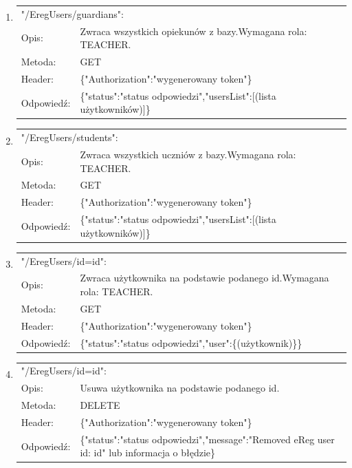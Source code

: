 \documentclass[12pt, titlepage]{article}
\begin{document}
\begin{enumerate}
	\item
	{\renewcommand{\arraystretch}{1.5}
	\begin{tabular}[t]{p{3cm} p{15cm}}
	\multicolumn{2}{l}{"/EregUsers/guardians":} \\
	Opis: &  Zwraca wszystkich opiekunów z bazy.\newline Wymagana rola: TEACHER. \\
	Metoda: & GET \\
	Header: & \{"Authorization":"wygenerowany token"\} \\
	Odpowiedź: & \{"status":"status odpowiedzi",\newline "usersList":[(lista użytkowników)]\}
	\end{tabular}}
	
	\item
	{\renewcommand{\arraystretch}{1.5}
	\begin{tabular}[t]{p{3cm} p{15cm}}
	\multicolumn{2}{l}{"/EregUsers/students":} \\
	Opis: &  Zwraca wszystkich uczniów z bazy.\newline Wymagana rola: TEACHER. \\
	Metoda: & GET \\
	Header: & \{"Authorization":"wygenerowany token"\} \\
	Odpowiedź: & \{"status":"status odpowiedzi",\newline "usersList":[(lista użytkowników)]\}
	\end{tabular}}
	
	\item
	{\renewcommand{\arraystretch}{1.5}
	\begin{tabular}[t]{p{3cm} p{15cm}}
	\multicolumn{2}{l}{"/EregUsers/id={id}":} \\
	Opis: &  Zwraca użytkownika na podstawie podanego id.\newline Wymagana rola: TEACHER. \\
	Metoda: & GET \\
	Header: & \{"Authorization":"wygenerowany token"\} \\
	Odpowiedź: & \{"status":"status odpowiedzi",\newline "user":\{(użytkownik)\}\}
	\end{tabular}}
	
	\item
	{\renewcommand{\arraystretch}{1.5}
	\begin{tabular}[t]{p{3cm} p{15cm}}
	\multicolumn{2}{l}{"/EregUsers/id={id}":} \\
	Opis: &  Usuwa użytkownika na podstawie podanego id. \\
	Metoda: & DELETE \\
	Header: & \{"Authorization":"wygenerowany token"\} \\
	Odpowiedź: & \{"status":"status odpowiedzi",\newline "message":"Removed eReg user id: {id}" lub informacja o błędzie\} 
	\end{tabular}}
	

\end{enumerate}
\end{document}

